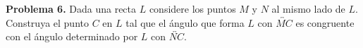 \documentclass{article}
\begin{document}
\vspace{5mm}
\noindent\textbf{Problema 6.} Dada una recta $L$ considere los puntos $M$ y $N$ al mismo lado de
$L$. Construya el punto $C$ en $L$ tal que el ángulo que forma $L$ con $\overleftrightarrow{MC}$
es congruente con el ángulo determinado por $L$ con $\overleftrightarrow{NC}$.

\end{document}
